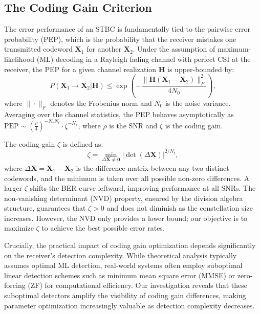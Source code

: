 \documentclass[twocolumn,conference]{IEEEtran}
\begin{document}
\subsection{The Coding Gain Criterion}
The error performance of an STBC is fundamentally tied to the pairwise error probability (PEP), which is the probability that the receiver mistakes one transmitted codeword $\mathbf{X}_1$ for another $\mathbf{X}_2$. 
Under the assumption of maximum-likelihood (ML) decoding in a Rayleigh fading channel with perfect CSI at the receiver, the PEP for a given channel realization $\mathbf{H}$ is upper-bounded by:
\begin{equation}
P(\mathbf{X}_1 \to \mathbf{X}_2 | \mathbf{H}) \leq \exp\left( -\frac{\|\mathbf{H}(\mathbf{X}_1 - \mathbf{X}_2)\|_F^2}{4N_0} \right),
\end{equation}
where $\|\cdot\|_F$ denotes the Frobenius norm and $N_0$ is the noise variance. Averaging over the channel statistics, the PEP behaves asymptotically as $\text{PEP} \sim \left( \frac{\rho}{4} \right)^{-N_r N_t} \cdot \zeta^{-N_r}$, where $\rho$ is the SNR and $\zeta$ is the coding gain.

The coding gain $\zeta$ is defined as:
\begin{equation}
\zeta = \min_{\Delta\mathbf{X} \neq \mathbf{0}} |\det(\Delta\mathbf{X})|^{2/N_t},
\end{equation}
where $\Delta\mathbf{X} = \mathbf{X}_1 - \mathbf{X}_2$ is the difference matrix between any two distinct codewords, and the minimum is taken over all possible non-zero differences. A larger $\zeta$ shifts the BER curve leftward, improving performance at all SNRs. The non-vanishing determinant (NVD) property, ensured by the division algebra structure, guarantees that $\zeta > 0$ and does not diminish as the constellation size increases. However, the NVD only provides a lower bound; our objective is to maximize $\zeta$ to achieve the best possible error rates.

Crucially, the practical impact of coding gain optimization depends significantly on the receiver's detection complexity. 
While theoretical analysis typically assumes optimal ML detection, real-world systems often employ suboptimal linear detection schemes such as minimum mean square error (MMSE) or zero-forcing (ZF) for computational efficiency.
Our investigation reveals that these suboptimal detectors amplify the visibility of coding gain differences, making parameter optimization increasingly valuable as detection complexity decreases.
\end{document}
